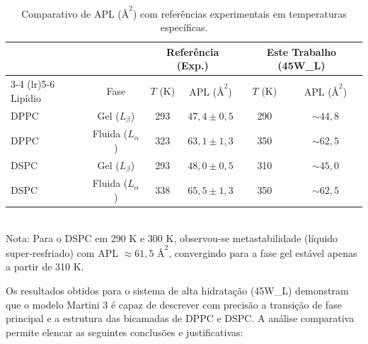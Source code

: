 \begin{table}[htbp]
    \centering
    \caption{Comparativo de APL ($\text{\AA}^2$) com referências experimentais em temperaturas específicas.}
    \label{tab:comparativo}
    \begin{tabular}{@{}lccccc@{}}
        \toprule
        & & \multicolumn{2}{c}{Referência (Exp.)} & \multicolumn{2}{c}{Este Trabalho (45W\_L)} \\ 
        \cmidrule(lr){3-4} \cmidrule(lr){5-6}
        Lipídio & Fase & $T$ (K) & APL ($\text{\AA}^2$) & $T$ (K) & APL ($\text{\AA}^2$) \\ \midrule
        DPPC    & Gel ($L_\beta$)     & 293 & $47,4 \pm 0,5$ & 290 & $\sim 44,8$ \\
        DPPC    & Fluida ($L_\alpha$) & 323 & $63,1 \pm 1,3$ & 350 & $\sim 62,5$ \\
        DSPC    & Gel ($L_\beta$)     & 293 & $48,0 \pm 0,5$ & 310 & $\sim 45,0$ \\
        DSPC    & Fluida ($L_\alpha$) & 338 & $65,5 \pm 1,3$ & 350 & $\sim 62,5$ \\ \bottomrule
    \end{tabular}
    \small \\ Nota: Para o DSPC em 290 K e 300 K, observou-se metastabilidade (líquido super-resfriado) com APL $\approx 61,5 \text{ \AA}^2$, convergindo para a fase gel estável apenas a partir de 310 K.
\end{table}


Os resultados obtidos para o sistema de alta hidratação (45W\_L) demonstram que o modelo Martini 3 é capaz de descrever com precisão a transição de fase principal e a estrutura das bicamadas de DPPC e DSPC. A análise comparativa permite elencar as seguintes conclusões e justificativas:

